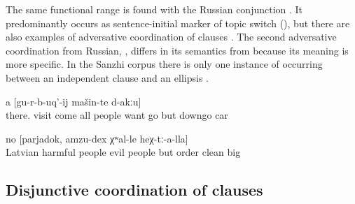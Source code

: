 The same functional range is found with the Russian conjunction  . It predominantly occurs as sentence-initial marker of topic switch (), but there are also examples of adversative coordination of clauses . The second adversative coordination from Russian,  , differs in its semantics from  because its meaning is more specific. In the Sanzhi corpus there is only one instance of  occurring between an independent clause and an ellipsis .
%
\begin{exe}
	\ex	\label{ex:‎There all the people who came want to leave, but there are no cars to leave}
	\gll	[hextːu-b	šːatːir	sa-b-ač'-ib-te	li<b>il=ra	χalq'	b-ikː-ul	ca-b	gu-r-b-uq'-aˁnaj]		a	[gu-r-b-uq'-ij	mašin-te	d-akːu]\\
		there.	visit	come 	all	people	want		go	but	downgo	car	\\
	\glt	{}

	\ex	\label{ex:‎‎‎The Latvian people were harmful, they were bad people, but order, cleanness is great among them}
	\gll	[latiši	wredni	χalq'=de,	wahi	χalq'=de]	no	[parjadok,	amzu-dex	χʷal-le	heχ-tː-a-lla]\\
		Latvian	harmful	people	evil	people	but	order	clean	big	\\
	\glt	{}
\end{exe}



\subsection{Disjunctive coordination of clauses}
\label{ssec:Disjunctive coordination of clauses}

